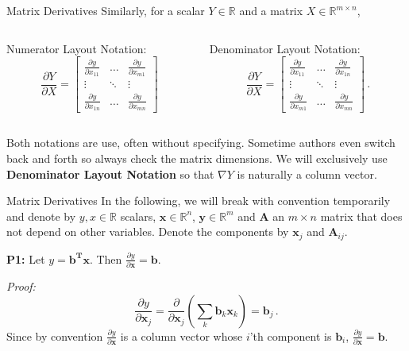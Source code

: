 \documentclass[10pt,handout]{beamer}
\begin{document}
\begin{frame}[fragile]{Matrix Derivatives}
Similarly, for a scalar $Y\in \mathbb{R}$ and a matrix $X\in \mathbb{R}^{m\times n}$,\vspace{2em}
\begin{columns}
\begin{column}{0.5\textwidth}
Numerator Layout Notation:
$$\frac{\partial Y}{\partial X} = 
\left[ 
\begin{matrix}
\frac{\partial y}{\partial x_{11}} & \ldots & \frac{\partial y}{\partial x_{m1}} \\
\vdots& \ddots &\vdots \\
\frac{\partial y}{\partial x_{1n}}&\ldots&\frac{\partial y}{\partial x_{mn}} 
\end{matrix}
\right]$$
\end{column}
\begin{column}{0.5\textwidth}  %
Denominator Layout Notation:
$$\frac{\partial Y}{\partial X} = 
\left[ 
\begin{matrix}
\frac{\partial y}{\partial x_{11}} & \ldots & \frac{\partial y}{\partial x_{1n}} \\
\vdots& \ddots &\vdots \\
\frac{\partial y}{\partial x_{m1}}&\ldots&\frac{\partial y}{\partial x_{mn}} 
\end{matrix}
\right]\,.$$
\end{column}
\end{columns}\vspace{2em}
Both notations are use, often without specifying. Sometime authors even switch back and forth so always check the matrix dimensions. We will exclusively use \textbf{Denominator Layout Notation} so that $\nabla Y$ is naturally a column vector. 
\end{frame}




\begin{frame}[fragile]{Matrix Derivatives}
In the following, we will break with convention temporarily and denote by $y,x \in \mathbb{R}$ scalars, $\mathbf{x} \in \mathbb{R}^n$, $\mathbf{y} \in \mathbb{R}^m$  and $\mathbf{A}$ an $m\times n$ matrix that does not depend on other variables. Denote the components by $\mathbf{x}_j$ and $\mathbf{A}_{ij}$. \newline 

\textbf{P1:} Let ${y} = \mathbf{b^Tx}.$ Then $\frac{\partial  {y}}{\partial \mathbf{x}} = \mathbf{b}$. \pause

\emph{Proof:}
$$
\frac{\partial y}{\partial \mathbf{x}_j}  = \frac{\partial}{\partial \mathbf{x}_j} \left(\sum_{k} \mathbf{b}_{k} \mathbf{x}_k\right) = \mathbf{b}_{j}\,.
$$
Since by convention $\frac{\partial y}{\partial \mathbf{x}}$ is a column vector whose $i$'th component is $\mathbf{b}_i$, $\frac{\partial y}{\partial \mathbf{x}} = \mathbf{b}$.


\end{frame}
\end{document}
